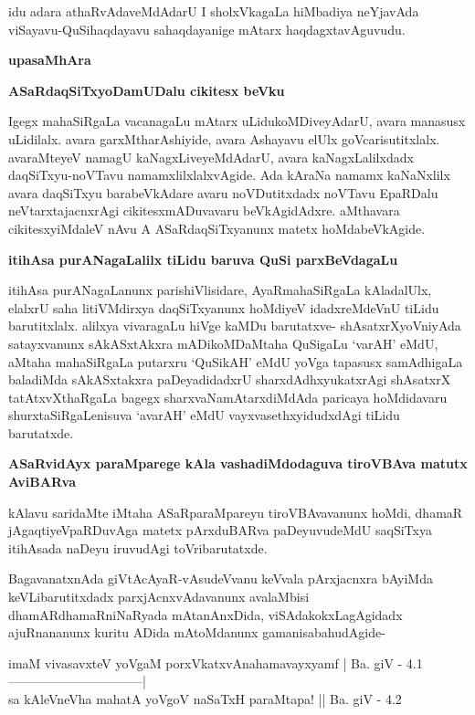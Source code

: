 idu adara athaRvAdaveMdAdarU I sholxVkagaLa hiMbadiya neYja\-vAda viSayavu-QuSihaqdayavu sahaqdayanige mAtarx haqdagxtavAguvudu.

\newpage

\begin{center}
{\Large{\textbf{upasaMhAra}}}
\end{center}
{
\noindent
{\large\bf ASaRdaqSiTxyoDamUDalu cikitesx beVku}}\label{page61}
\medskip

\noindent
Igegx mahaSiRgaLa vacanagaLu mAtarx uLidukoMDiveyAdarU, avara \hbox{manasusx} uLidilalx. avara garxMtha\-rAshiyide, avara Ashayavu elUlx goVcarisutitxlalx. ava\-raMteyeV namagU kaNagxLiveyeMdAdarU, avara kaNagxLalilxdadx daqSiTxyu-noVTavu namamxlilxlalxvAgide. Ada kAraNa namamx kaNaNxlilx avara daqSiTxyu barabeVkAdare avaru noVDutitxdadx noVTavu EpaRDalu neVtarxtajacnxrAgi cikitesxmADuvavaru beVkAgidAdxre. aMthavara cikitesxyiMdaleV nAvu A ASaRdaqSiTxyanunx matetx hoMdabeVkAgide.

{\bigskip
\noindent
{\large\bf itihAsa purANagaLalilx tiLidu baruva QuSi parxBeVdagaLu}}\label{page62}
\medskip

\noindent
itihAsa purANagaLanunx parishiVlisidare, AyaRmahaSiRgaLa kAladalUlx, elalxrU saha litiVMdirxya daqSiTxyanunx hoMdiyeV idadxreMdeVnU tiLidu barutitxlalx. alilxya vivaragaLu hiVge kaMDu baru\-tatxve- shAsatxrXyoVniyAda satayxvanunx sAkASxtAkxra mADikoMDaMtaha QuSigaLu `varAH' eMdU, aMtaha maha\-SiRgaLa putarxru `QuSikAH' eMdU yoVga tapasusx samAdhigaLa baladiMda sAkASxtakxra paDeya\-didadxrU sharxdAdhx\-yukatxrAgi shAsatxrX tatAtxvXthaRgaLa bagegx sharxvaNamAtarxdiMdAda paricaya hoMdidavaru shurxta\-SiR\-gaLenisuva `avarAH' eMdU vayxvasethxyidudxdAgi tiLidu barutatxde.

{\bigskip
\noindent
{\large\bf ASaRvidAyx paraMparege kAla vashadiMdodaguva tiroVBAva matutx AviBARva}}\label{page62a}
\medskip

\noindent
kAlavu saridaMte iMtaha ASaRparaMpareyu tiroVBAvavanunx hoMdi, dhamaR jAgaqtiyeVpaRDu\-vAga matetx pArxduBARva paDeyuvudeMdU saqSiTxya itihAsada naDeyu iruvudAgi toVribarutatxde.

BagavanatxnAda giVtAcAyaR-vAsudeVvanu keVvala pArxjacnxra bAyiMda keVLibarutitxdadx parxjAcnxvAda\-vanunx avalaMbisi dhamARdhamaRniNaRyada mAtanAnxDida, viSAda\-kokxLagAgidadx ajuRnananunx kuritu ADida mAtoMdanunx gamanisabahudAgide-

\begin{shloka}
imaM vivasavxteV yoVgaM porxVkatxvAnahamavayxyamf | Ba. giV - 4.1\label{62}\\ 
--------------------------------|\\
sa kAleVneVha mahatA yoVgoV naSaTxH paraMtapa! || Ba. giV - 4.2\label{62a}
\end{shloka}

